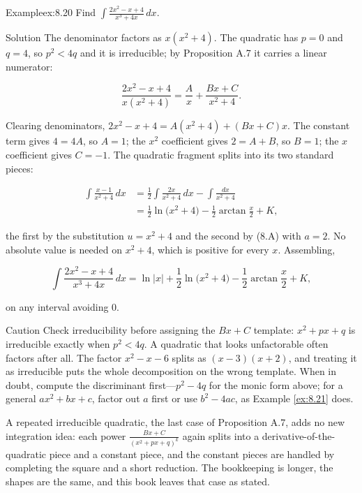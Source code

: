 \documentclass[a4paper,12pt,oneside]{memoir}
\begin{document}
\begin{workedexample}
\begin{envexample}{Example}{ex:8.20}{}
Find \(\displaystyle\int \frac{2x^{2} - x + 4}{x^{3} + 4x}\,dx\).
\end{envexample}
\begin{envsolution}{Solution}{}{}
The denominator factors as \(x(x^{2} + 4)\). The quadratic has \(p = 0\) and \(q = 4\), so \(p^{2} < 4q\) and it is irreducible; by Proposition A.7 it carries a linear numerator:

\[ \frac{2x^{2} - x + 4}{x(x^{2} + 4)} = \frac{A}{x} + \frac{Bx + C}{x^{2} + 4}. \]

Clearing denominators, \(2x^{2} - x + 4 = A(x^{2} + 4) + (Bx + C)x\). The constant term gives \(4 = 4A\), so \(A = 1\); the \(x^{2}\) coefficient gives \(2 = A + B\), so \(B = 1\); the \(x\) coefficient gives \(C = -1\). The quadratic fragment splits into its two standard pieces:

\[ \begin{aligned}
          \int \frac{x - 1}{x^{2} + 4}\,dx &= \frac{1}{2}\int \frac{2x}{x^{2} + 4}\,dx - \int \frac{dx}{x^{2} + 4} \\[2pt]
            &= \frac{1}{2}\ln\bigl(x^{2} + 4\bigr) - \frac{1}{2}\arctan\frac{x}{2} + K,
        \end{aligned} \]

the first by the substitution \(u = x^{2} + 4\) and the second by (8.A) with \(a = 2\). No absolute value is needed on \(x^{2} + 4\), which is positive for every \(x\). Assembling,

\[ \int \frac{2x^{2} - x + 4}{x^{3} + 4x}\,dx = \ln\lvert x\rvert + \frac{1}{2}\ln\bigl(x^{2} + 4\bigr) - \frac{1}{2}\arctan\frac{x}{2} + K, \]

on any interval avoiding \(0\). \qedmark
\end{envsolution}
\end{workedexample}
\begin{envcaution}{Caution}{}{}
Check irreducibility before assigning the \(Bx + C\) template: \(x^{2} + px + q\) is irreducible exactly when \(p^{2} < 4q\). A quadratic that looks unfactorable often factors after all. The factor \(x^{2} - x - 6\) splits as \((x - 3)(x + 2)\), and treating it as irreducible puts the whole decomposition on the wrong template. When in doubt, compute the discriminant first—\(p^{2} - 4q\) for the monic form above; for a general \(ax^{2} + bx + c\), factor out \(a\) first or use \(b^{2} - 4ac\), as Example \ref{ex:8.21} does.
\end{envcaution}
A repeated irreducible quadratic, the last case of Proposition A.7, adds no new integration idea: each power \(\frac{Bx + C}{(x^{2} + px + q)^{k}}\) again splits into a derivative-of-the-quadratic piece and a constant piece, and the constant pieces are handled by completing the square and a short reduction. The bookkeeping is longer, the shapes are the same, and this book leaves that case as stated.
\end{document}
